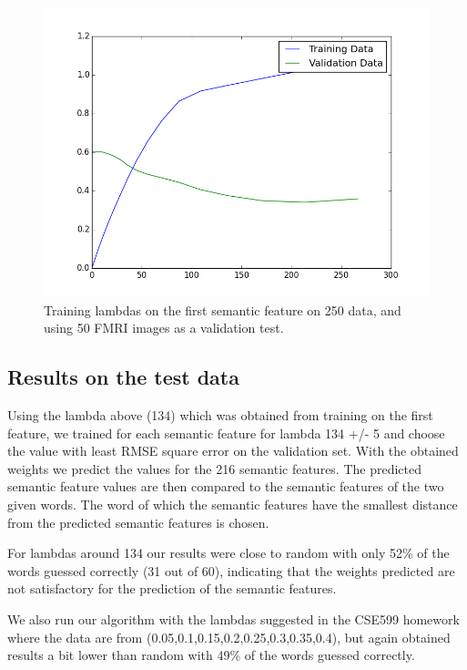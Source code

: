 \documentclass{article} %
\begin{document}
\begin{figure}[h]
\begin{center}
\includegraphics[scale=0.5]{trainvalidlambda}
\end{center}
\caption{Training lambdas on the first semantic feature on 250 data, and using 50 FMRI images as a validation test.}
\end{figure}

\subsection{Results on the test data}

Using the lambda above (134) which was obtained from training on the first feature,  we trained for each semantic feature for lambda 134 +/- 5 and choose the value with least RMSE square error on the validation set. With the obtained weights we predict the values for the 216 semantic features. The predicted semantic feature values are then compared to the semantic features of the two given words. The word of which the semantic features have the smallest distance from the predicted semantic features is chosen. 

For lambdas around 134 our results were close to random with only 52\% of the words guessed correctly (31 out of 60), indicating that the weights predicted are not satisfactory for the prediction of the semantic features.

We also run our algorithm with the lambdas suggested in the CSE599 homework where the data are from (0.05,0.1,0.15,0.2,0.25,0.3,0.35,0.4), but again obtained results a bit lower than random with 49\% of the words guessed correctly.
\end{document}

